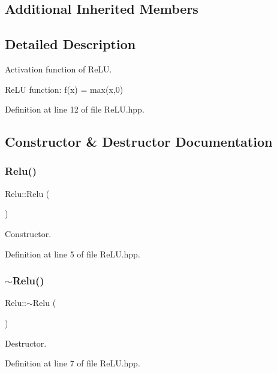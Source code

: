 \subsection*{Additional Inherited Members}


\subsection{Detailed Description}
Activation function of Re\+LU. 

Re\+LU function\+: f(x) = max(x,0) 

Definition at line 12 of file Re\+L\+U.\+hpp.



\subsection{Constructor \& Destructor Documentation}
\mbox{\label{class_relu_ade6da5fa61d942a8f50d661dc997a985}} 
\subsubsection{\texorpdfstring{Relu()}{Relu()}}
{\footnotesize\ttfamily Relu\+::\+Relu (\begin{DoxyParamCaption}{ }\end{DoxyParamCaption})}



Constructor. 



Definition at line 5 of file Re\+L\+U.\+hpp.

\mbox{\label{class_relu_a5be6c8bbdae0dd17597cfeaad4eee717}} 
\subsubsection{\texorpdfstring{$\sim$\+Relu()}{~Relu()}}
{\footnotesize\ttfamily Relu\+::$\sim$\+Relu (\begin{DoxyParamCaption}{ }\end{DoxyParamCaption})}



Destructor. 



Definition at line 7 of file Re\+L\+U.\+hpp.



